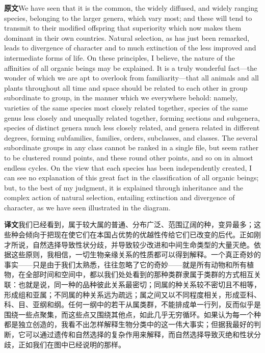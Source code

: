 \documentclass[UTF8,zihao=-4]{ctexart}
\newcommand{\BodyFont}{\fontsize{10.5pt}{15.5pt}\selectfont}
\newcommand{\origlabel}{\textbf{原文}\quad}
\newcommand{\translabel}{\textbf{译文}\quad}
\newenvironment{enblock}{\par\noindent\begingroup\BodyFont\origlabel}{\par\endgroup}
\newenvironment{zhblock}{\par\noindent\begingroup\BodyFont\translabel}{\par\endgroup\vspace{0.35em}}
\newcommand{\pair}[2]{\begin{enblock}#1\end{enblock}\begin{zhblock}#2\end{zhblock}}
\begin{document}
\pair{We have seen that it is the common, the widely diffused, and widely ranging species, belonging to the larger genera, which vary most; and these will tend to transmit to their modified offspring that superiority which now makes them dominant in their own countries. Natural selection, as has just been remarked, leads to divergence of character and to much extinction of the less improved and intermediate forms of life. On these principles, I believe, the nature of the affinities of all organic beings may be explained. It is a truly wonderful fact—the wonder of which we are apt to overlook from familiarity—that all animals and all plants throughout all time and space should be related to each other in group subordinate to group, in the manner which we everywhere behold: namely, varieties of the same species most closely related together, species of the same genus less closely and unequally related together, forming sections and subgenera, species of distinct genera much less closely related, and genera related in different degrees, forming subfamilies, families, orders, subclasses, and classes. The several subordinate groups in any class cannot be ranked in a single file, but seem rather to be clustered round points, and these round other points, and so on in almost endless cycles. On the view that each species has been independently created, I can see no explanation of this great fact in the classification of all organic beings; but, to the best of my judgment, it is explained through inheritance and the complex action of natural selection, entailing extinction and divergence of character, as we have seen illustrated in the diagram.}{我们已经看到，属于较大属的普通、分布广泛、范围辽阔的种，变异最多；这些种会倾向于把现在使它们在本国占优势的优越性传给它们已改变的后代。正如刚才所说，自然选择导致性状分歧，并导致较少改进和中间生命类型的大量灭绝。依据这些原则，我相信，一切生物亲缘关系的性质都可以得到解释。一个真正奇妙的事实——只是由于我们太熟悉，往往忽略了它的奇妙——就是所有动物和所有植物，在全部时间和空间中，都以我们处处看到的那种类群隶属于类群的方式相互关联：也就是说，同一种的品种彼此关系最密切；同属的种关系较不密切且不相等，形成组和亚属；不同属的种关系远为疏远；属之间又以不同程度相关，形成亚科、科、目、亚纲和纲。任何一纲中的若干从属类群，不能排成单一行列，反而似乎是围绕一些点聚集，而这些点又围绕其他点，如此几乎无穷循环。如果认为每一个种都是独立创造的，我看不出怎样解释生物分类中的这一伟大事实；但据我最好的判断，它可以通过遗传和自然选择的复杂作用来解释，而自然选择导致灭绝和性状分歧，正如我们在图中已经说明的那样。}
\end{document}
